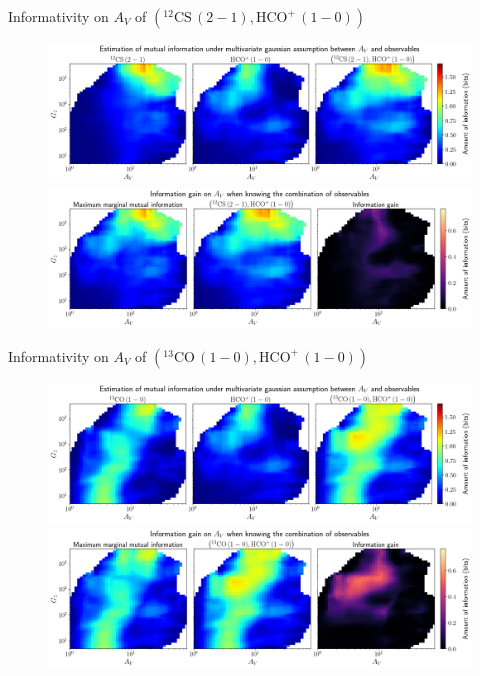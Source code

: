 \documentclass{beamer}
\begin{document}
\begin{frame}{Informativity on $A_V$ of $\left(\mathrm{^{12}CS\,(2-1)},\mathrm{HCO^+\,(1-0)}\right)$}
    \begin{figure}
        \centering
        \includegraphics[width=0.95\linewidth]{../linearinfo/av__12cs21_hcop10_linearinfo.png}
        \vfill
        \includegraphics[width=0.95\linewidth]{../linearinfo/av__12cs21_hcop10_linearinfo_gain.png}
    \end{figure}
\end{frame}

\begin{frame}{Informativity on $A_V$ of $\left(\mathrm{^{13}CO\,(1-0)},\mathrm{HCO^+\,(1-0)}\right)$}
    \begin{figure}
        \centering
        \includegraphics[width=0.95\linewidth]{../linearinfo/av__13co10_hcop10_linearinfo.png}
        \vfill
        \includegraphics[width=0.95\linewidth]{../linearinfo/av__13co10_hcop10_linearinfo_gain.png}
    \end{figure}
\end{frame}
\end{document}

